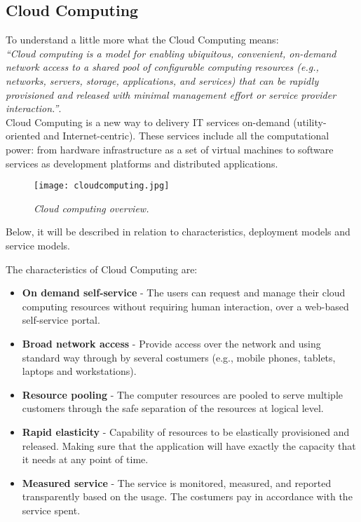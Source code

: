 \subsection{Cloud Computing}



To understand a little more what the Cloud Computing means:\\

\textit{``Cloud computing is a model for enabling ubiquitous, convenient, on-demand network access to a shared pool of configurable computing resources (e.g., networks, servers, storage, applications, and services) that can be rapidly provisioned and released with minimal management effort or service provider interaction.''}\cite{mell2011nist}.\\

Cloud Computing is a new way to delivery IT services on-demand (utility-oriented and Internet-centric). These services include all the computational power: from hardware infrastructure as a set of virtual machines to software services as development platforms and distributed applications.

\begin{figure}[!ht]
\begin{center}
\texttt{[image: cloudcomputing.jpg]}
\caption{\small \sl Cloud computing overview.\label{fig:cloudcomputing}}
\end{center}
\end{figure}

Below, it will be described in relation to characteristics, deployment models and service models\cite{schouten2013ibm}.

The characteristics of Cloud Computing are:
\begin{itemize}
	\item \textbf{On demand self-service} 	- The users can request and manage their cloud computing resources without requiring human interaction, over a web-based self-service portal.
	\item \textbf{Broad network access 	}	- Provide access over the network and using standard way through by several costumers (e.g., mobile phones, tablets, laptops and workstations).
	\item \textbf{Resource pooling 		}	- The computer resources are pooled to serve multiple customers through the safe separation of the resources at logical level.
	\item \textbf{Rapid elasticity 		}	- Capability of resources to be elastically provisioned and released. Making sure that the application will have exactly the capacity that it needs at any point of time.
	\item \textbf{Measured service 		}	- The service is monitored, measured, and reported transparently based on the usage. The costumers pay in accordance with the service spent.
\end{itemize}

